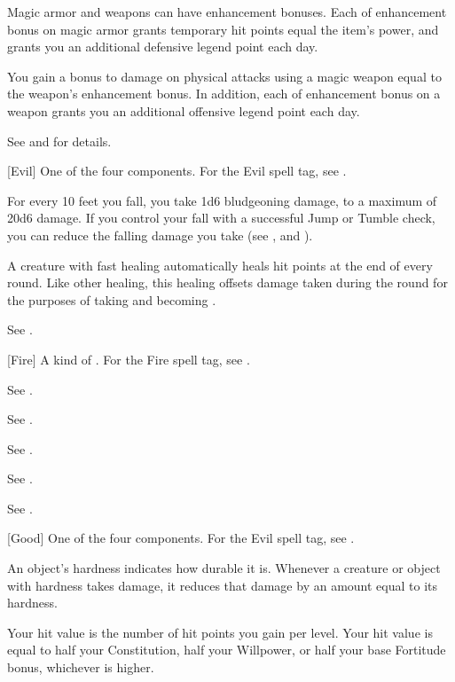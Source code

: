  Magic armor and weapons can have enhancement bonuses.
Each  of enhancement bonus on magic armor grants temporary hit points equal the item's power, and grants you an additional defensive legend point each day.

You gain a bonus to damage on physical attacks using a magic weapon equal to the weapon's enhancement bonus.
In addition, each  of enhancement bonus on a weapon grants you an additional offensive legend point each day.

See  and  for details.

[Evil] One of the four  components. For the Evil spell tag, see .

 For every 10 feet you fall, you take 1d6 bludgeoning damage, to a maximum of 20d6 damage.
If you control your fall with a successful Jump or Tumble check, you can reduce the falling damage you take (see , and ).

 A creature with fast healing automatically heals hit points at the end of every round.
Like other healing, this healing offsets damage taken during the round for the purposes of taking  and becoming \disabled.

 See .

[Fire] A kind of . For the Fire spell tag, see .

 See .

 See .

 See .

 See .

 See .

[Good] One of the four  components. For the Evil spell tag, see .

 An object's hardness indicates how durable it is.
Whenever a creature or object with hardness takes damage, it reduces that damage by an amount equal to its hardness.

 Your hit value is the number of hit points you gain per level. Your hit value is equal to half your Constitution, half your Willpower, or half your base Fortitude bonus, whichever is higher.

